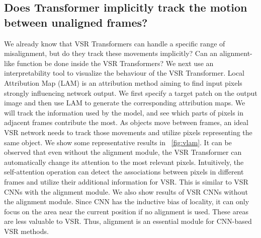 \documentclass{article}
\begin{document}
\subsection{Does Transformer implicitly track the motion between unaligned frames?}
\label{sec:rethinking:vlam}
\vspace{-2mm}
We already know that VSR Transformers can handle a specific range of misalignment, but do they track these movements implicitly?
Can an alignment-like function be done inside the VSR Transformers?
We next use an interpretability tool to visualize the behaviour of the VSR Transformer.
Local Attribution Map (LAM) \cite{gu2021interpreting} is an attribution method aiming to find input pixels strongly influencing network output.
We first specify a target patch on the output image and then use LAM to generate the corresponding attribution maps.
We will track the information used by the model, and see which parts of pixels in adjacent frames contribute the most. 
As objects move between frames, an ideal VSR network needs to track those movements and utilize pixels representing the same object.
We show some representative results in \figurename~\ref{fig:vlam}.
It can be observed that even without the alignment module, the VSR Transformer can automatically change its attention to the most relevant pixels.
Intuitively, the self-attention operation can detect the associations between pixels in different frames and utilize their additional information for VSR.
This is similar to VSR CNNs with the alignment module.
We also show results of VSR CNNs without the alignment module.
Since CNN has the inductive bias of locality, it can only focus on the area near the current position if no alignment is used. These areas are less valuable to VSR.
Thus, alignment is an essential module for CNN-based VSR methods.
\end{document}
